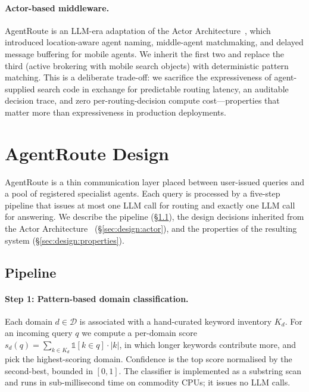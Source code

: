 \documentclass[11pt]{article}
\begin{document}
\paragraph{Actor-based middleware.}
AgentRoute is an LLM-era adaptation of the Actor
Architecture~\citep{jang2005efficient}, which introduced location-aware
agent naming, middle-agent matchmaking, and delayed message buffering for
mobile agents. We inherit the first two and replace the third (active
brokering with mobile search objects) with deterministic pattern
matching. This is a deliberate trade-off: we sacrifice the expressiveness
of agent-supplied search code in exchange for predictable routing
latency, an auditable decision trace, and zero per-routing-decision
compute cost---properties that matter more than expressiveness in
production deployments.


\section{AgentRoute Design}
\label{sec:design}

AgentRoute is a thin communication layer placed between user-issued queries
and a pool of registered specialist agents. Each query is processed by a
five-step pipeline that issues at most one LLM call for routing and exactly
one LLM call for answering. We describe the pipeline
(\S\ref{sec:design:pipeline}), the design decisions inherited from the Actor
Architecture~\citep{jang2005efficient} (\S\ref{sec:design:actor}), and the
properties of the resulting system (\S\ref{sec:design:properties}).

\subsection{Pipeline}
\label{sec:design:pipeline}

\paragraph{Step 1: Pattern-based domain classification.}
Each domain $d \in \mathcal{D}$ is associated with a hand-curated keyword
inventory $K_d$. For an incoming query $q$ we compute a per-domain score
$s_d(q) = \sum_{k \in K_d} \mathbb{1}[k \in q] \cdot |k|$, in which longer
keywords contribute more, and pick the highest-scoring domain. Confidence is
the top score normalised by the second-best, bounded in $[0, 1]$. The
classifier is implemented as a substring scan and runs in sub-millisecond
time on commodity CPUs; it issues no LLM calls.
\end{document}
